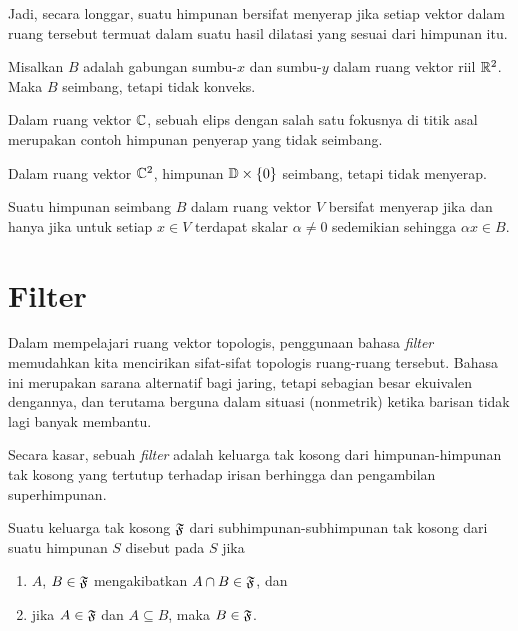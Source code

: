 Jadi, secara longgar, suatu himpunan bersifat menyerap jika setiap vektor dalam ruang tersebut termuat dalam suatu hasil dilatasi yang sesuai dari himpunan itu.

\begin{exam} Misalkan $B$ adalah gabungan sumbu-$x$ dan sumbu-$y$ dalam ruang vektor riil $\mathbb{R}^2$.  Maka $B$ seimbang, tetapi tidak konveks.
\end{exam}

\begin{exam} Dalam ruang vektor $\mathbb{C}$, sebuah elips dengan salah satu fokusnya di titik asal merupakan contoh himpunan penyerap yang tidak seimbang.
\end{exam}

\begin{exam} Dalam ruang vektor $\mathbb{C}^2$, himpunan $\mathbb{D} \times \{0\}$ seimbang, tetapi tidak menyerap.
\end{exam}

\begin{prop} Suatu himpunan seimbang $B$ dalam ruang vektor $V$ bersifat menyerap jika dan hanya jika untuk setiap $x \in V$ terdapat skalar
$\alpha \ne 0$ sedemikian sehingga $\alpha x \in B$.
\end{prop}











\section{Filter}

Dalam mempelajari ruang vektor topologis, penggunaan bahasa \emph{filter} memudahkan kita mencirikan sifat-sifat topologis
ruang-ruang tersebut.  Bahasa ini merupakan sarana alternatif bagi jaring, tetapi sebagian besar ekuivalen dengannya, dan terutama berguna dalam situasi (nonmetrik) ketika barisan
tidak lagi banyak membantu.

Secara kasar, sebuah \emph{filter} adalah keluarga tak kosong dari himpunan-himpunan tak kosong yang tertutup terhadap irisan berhingga dan pengambilan superhimpunan.

\begin{defn} Suatu keluarga tak kosong $\mathfrak{F}$ dari subhimpunan-subhimpunan tak kosong dari suatu himpunan $S$ disebut
 pada $S$ jika
   \begin{enumerate}[label=(\alph*)]
     \item $A$, $B \in \mathfrak{F}$ mengakibatkan $A \cap B \in \mathfrak{F}$, dan
     \item jika $A \in \mathfrak{F}$ dan $A \subseteq B$, maka $B \in \mathfrak{F}$.
   \end{enumerate}
\end{defn}

